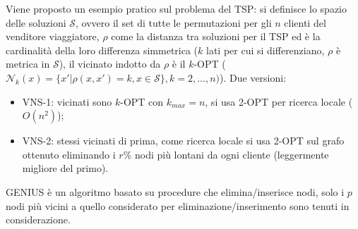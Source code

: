 Viene proposto un esempio pratico sul problema del TSP: si definisce lo spazio delle soluzioni $\mathcal{S}$, ovvero il set di tutte le permutazioni per gli $n$ clienti del venditore viaggiatore, $\rho$ come la distanza tra soluzioni per il TSP ed è la cardinalità della loro differenza simmetrica ($k$ lati per cui si differenziano, $\rho$ è metrica in $\mathcal{S}$), il vicinato indotto da $\rho$ è il $k$-OPT ($\mathcal{N}_k(x)=\{x'|\rho(x,x')=k,x\in \mathcal{S}\},k=2,\dots,n)$).
Due versioni:
\begin{itemize}
	\item VNS-1: vicinati sono $k$-OPT con $k_{max}=n$, si usa 2-OPT per ricerca locale ($O(n^2)$);
	\item VNS-2: stessi vicinati di prima, come ricerca locale si usa 2-OPT sul grafo  ottenuto eliminando i $r\%$ nodi più lontani da ogni cliente (leggermente migliore del primo).
\end{itemize}
GENIUS è un algoritmo basato su procedure che elimina/inserisce nodi, solo i $p$ nodi più vicini a quello considerato per eliminazione/inserimento sono tenuti in considerazione.

